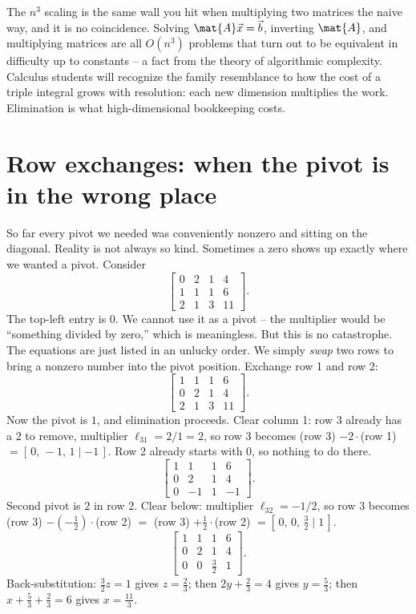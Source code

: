 \begin{connectionbox}
The $n^3$ scaling is the same wall you hit when multiplying two matrices the
naive way, and it is no coincidence. Solving $\mat{A}\vec{x}=\vec{b}$,
inverting $\mat{A}$, and multiplying matrices are all $O(n^3)$ problems that turn
out to be equivalent in difficulty up to constants -- a fact from the theory of
algorithmic complexity. Calculus students will recognize the family resemblance
to how the cost of a triple integral grows with resolution: each new dimension
multiplies the work. Elimination is what high-dimensional bookkeeping costs.
\end{connectionbox}

\section{Row exchanges: when the pivot is in the wrong place}

So far every pivot we needed was conveniently nonzero and sitting on the
diagonal. Reality is not always so kind. Sometimes a zero shows up exactly where
we wanted a pivot. Consider
\[
\left[\begin{array}{ccc|c}
0 & 2 & 1 & 4\\
1 & 1 & 1 & 6\\
2 & 1 & 3 & 11
\end{array}\right].
\]
The top-left entry is $0$. We cannot use it as a pivot -- the multiplier would
be ``something divided by zero,'' which is meaningless. But this is no
catastrophe. The equations are just listed in an unlucky order. We simply
\emph{swap} two rows to bring a nonzero number into the pivot position. Exchange
row 1 and row 2:
\[
\left[\begin{array}{ccc|c}
1 & 1 & 1 & 6\\
0 & 2 & 1 & 4\\
2 & 1 & 3 & 11
\end{array}\right].
\]
Now the pivot is $1$, and elimination proceeds. Clear column 1: row 3 already
has a $2$ to remove, multiplier $\ell_{31}=2/1=2$, so row 3 becomes (row 3)
$-2\cdot$(row 1) $= [\,0,\,-1,\,1\mid -1\,]$. Row 2 already starts with $0$, so
nothing to do there.
\[
\left[\begin{array}{ccc|c}
1 & 1 & 1 & 6\\
0 & 2 & 1 & 4\\
0 & -1 & 1 & -1
\end{array}\right].
\]
Second pivot is $2$ in row 2. Clear below: multiplier $\ell_{32}=-1/2$, so row 3
becomes (row 3) $-(-\tfrac12)\cdot$(row 2) $=$ (row 3) $+\tfrac12\cdot$(row 2)
$= [\,0,\,0,\,\tfrac32\mid 1\,]$.
\[
\left[\begin{array}{ccc|c}
1 & 1 & 1 & 6\\
0 & 2 & 1 & 4\\
0 & 0 & \tfrac32 & 1
\end{array}\right].
\]
Back-substitution: $\tfrac32 z = 1$ gives $z = \tfrac23$; then $2y + \tfrac23 =
4$ gives $y = \tfrac53$; then $x + \tfrac53 + \tfrac23 = 6$ gives $x = \tfrac{11}{3}$.


